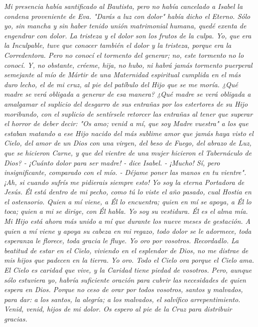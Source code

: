 \documentclass[12pt]{book} %
\begin{document}
\emph{Mi presencia había santificado al Bautista, pero no había cancelado a Isabel la condena proveniente de Eva. "Darás a luz con dolor" había dicho el Eterno. Sólo yo, sin mancha y sin haber tenido unión matrimonial humana, quedé exenta de engendrar con dolor. La tristeza y el dolor son los frutos de la culpa. Yo, que era la Inculpable, tuve que conocer también el dolor y la tristeza, porque era la Corredentora. Pero no conocí el tormento del generar; no, este tormento no lo conocí. Y, no obstante, créeme, hija, no hubo, ni habrá jamás tormento puerperal semejante al mío de Mártir de una Maternidad espiritual cumplida en el más duro lecho, el de mi cruz, al pie del patíbulo del Hijo que se me moría. ¿Qué madre se verá obligada a generar de esa manera? ¿Qué madre se verá obligada a amalgamar el suplicio del desgarro de sus entrañas por los estertores de su Hijo moribundo, con el suplicio de sentírsele retorcer las entrañas al tener que superar el horror de deber decir: "Os amo; venid a mí, que soy Madre vuestra" a los que estaban matando a ese Hijo nacido del más sublime amor que jamás haya visto el Cielo, del amor de un Dios con una virgen, del beso de Fuego, del abrazo de Luz, que se hicieron Carne, y que del vientre de una mujer hicieron el Tabernáculo de Dios? - ¡Cuánto dolor para ser madre! - dice Isabel. - ¡Mucho! Sí, pero insignificante, comparado con el mío. - Déjame poner las manos en tu vientre". ¡Ah, si cuando sufrís me pidierais siempre esto! Yo soy la eterna Portadora de Jesús. Él está dentro de mi pecho, como tú lo viste el año pasado, cual Hostia en el ostensorio. Quien a mí viene, a Él lo encuentra; quien en mí se apoya, a Él lo toca; quien a mi se dirige, con Él habla. Yo soy su vestidura. Él es el alma mía. Mi Hijo está ahora más unido a mí que durante los nueve meses de gestación. A quien a mí viene y apoya su cabeza en mi regazo, todo dolor se le adormece, toda esperanza le florece, toda gracia le fluye. Yo oro por vosotros. Recordadlo. La beatitud de estar en el Cielo, viviendo en el esplendor de Dios, no me distrae de mis hijos que padecen en la tierra. Yo oro. Todo el Cielo ora porque el Cielo ama. El Cielo es caridad que vive, y la Caridad tiene piedad de vosotros. Pero, aunque sólo estuviera yo, habría suficiente oración para cubrir las necesidades de quien espera en Dios. Porque no ceso de orar por todos vosotros, santos y malvados, para dar: a los santos, la alegría; a los malvados, el salvífico arrepentimiento. Venid, venid, hijos de mi dolor. Os espero al pie de la Cruz para distribuir gracias. }
 
\end{document}
